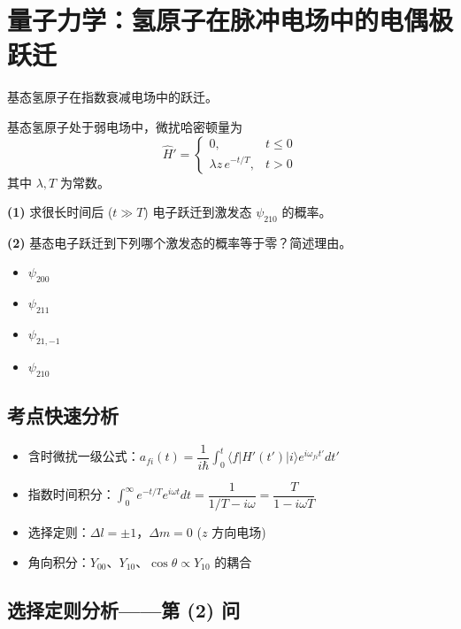 
\section{量子力学：氢原子在脉冲电场中的电偶极跃迁}
\label{sec:hydrogen-pulse}

\begin{modelbox}[氢原子在脉冲电场中的电偶极跃迁]
基态氢原子在指数衰减电场中的跃迁。

基态氢原子处于弱电场中，微扰哈密顿量为
\[
\hat{H}' = \begin{cases}
0, & t \leq 0 \\[4pt]
\lambda z\, e^{-t/T}, & t > 0
\end{cases}
\]
其中 $\lambda, T$ 为常数。

\textbf{(1)} 求很长时间后 ($t \gg T$) 电子跃迁到激发态 $\psi_{210}$ 的概率。

\textbf{(2)} 基态电子跃迁到下列哪个激发态的概率等于零？简述理由。
\begin{itemize}
\item[A.] $\psi_{200}$
\item[B.] $\psi_{211}$
\item[C.] $\psi_{21,-1}$
\item[D.] $\psi_{210}$
\end{itemize}
\end{modelbox}

\subsection{考点快速分析}

\begin{tipbox}[考点快速分析]
\begin{itemize}
\item 含时微扰一级公式：$a_{fi}(t) = \dfrac{1}{i\hbar} \int_0^t \langle f|H'(t')|i\rangle e^{i\omega_{fi}t'} dt'$
\item 指数时间积分：$\int_0^\infty e^{-t/T} e^{i\omega t} dt = \dfrac{1}{1/T - i\omega} = \dfrac{T}{1 - i\omega T}$
\item 选择定则：$\Delta l = \pm 1$，$\Delta m = 0$ ($z$ 方向电场)
\item 角向积分：$Y_{00}$、$Y_{10}$、$\cos\theta \propto Y_{10}$ 的耦合
\end{itemize}
\end{tipbox}

\subsection{选择定则分析——第 (2) 问}

